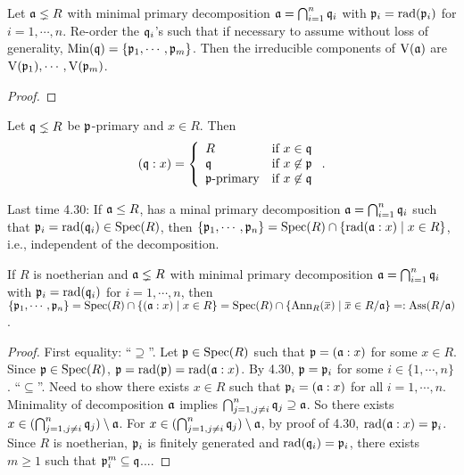 \begin{proposition}
    Let $\mathfrak{a} \lneq R$ with minimal primary decomposition $\mathfrak{a} = \bigcap_{i=1}^{n} \mathfrak{q}_i$ with $\mathfrak{p}_i = \operatorname{rad}(\mathfrak{p}_i)$ for $i = 1,\cdots,n$. Re-order the $\mathfrak{q}_i$'s such that if necessary to assume without loss of generality, $\operatorname{Min}(\mathfrak{q}) = \{\mathfrak{p}_1,\cdots,\mathfrak{p}_m\}$. Then the irreducible components of $\operatorname{V}(\mathfrak{a})$ are $\operatorname{V}(\mathfrak{p}_1),\cdots,\operatorname{V}(\mathfrak{p}_m)$.
\end{proposition}

\begin{proof}
\end{proof}

\begin{proposition}
    Let $\mathfrak{q} \lneq R$ be $\mathfrak{p}$-primary and $x \in R$. Then 
    \[
        (\mathfrak{q}:x) = \left\{
            \begin{array}{ll}
                R &\text{if }x \in \mathfrak{q} \\
                \mathfrak{q} &\text{if }x \not \in \mathfrak{p} \\
                \mathfrak{p}\text{-primary} &\text{if }x \not \in \mathfrak{q} \\
            \end{array}
        \right..
    \]
\end{proposition}

Last time 4.30: If $\mathfrak{a} \leq R$, has a minal primary decomposition $\mathfrak{a} = \bigcap_{i=1}^{n}\mathfrak{q}_i$ such that $\mathfrak{p}_i = \operatorname{rad}(\mathfrak{q}_i) \in \operatorname{Spec}(R)$, then $\{\mathfrak{p}_1,\cdots,\mathfrak{p}_n\} = \operatorname{Spec}(R) \cap \{\operatorname{rad}(\mathfrak{a}:x) \mid x \in R\}$, i.e., independent of the decomposition. 

\begin{theorem}
    If $R$ is noetherian and $\mathfrak{a} \lneq R$ with minimal primary decomposition $\mathfrak{a} = \bigcap_{i=1}^{n} \mathfrak{q}_i$ with $\mathfrak{p}_i = \operatorname{rad}(\mathfrak{q}_i)$ for $i = 1,\cdots,n$, then $\{\ffp_1,\cdots,\ffp_n\} = \operatorname{Spec}(R) \cap \{(\ffa:x) \mid x \in R\} = \operatorname{Spec}(R) \cap \{\operatorname{Ann}_R(\overbar{x}) \mid \overbar{x} \in R/\ffa\} =: \operatorname{Ass}(R/\ffa)$.
\end{theorem}

\begin{proof}
    First equality: ``$\supseteq$''. Let $\mathfrak{p} \in \operatorname{Spec}(R)$ such that $\mathfrak{p} = (\mathfrak{a}:x)$ for some $x \in R$. Since $\mathfrak{p} \in \operatorname{Spec}(R)$, $\mathfrak{p} = \operatorname{rad}(\mathfrak{p}) = \operatorname{rad}(\mathfrak{a}:x)$. By 4.30, $\mathfrak{p} = \mathfrak{p}_i$ for some $i \in \{1,\cdots,n\}$. ``$\subseteq$''. Need to show there exists $x \in R$ such that $\mathfrak{p}_i = (\mathfrak{a}:x)$ for all $i=1,\cdots,n$. Minimality of decomposition $\mathfrak{a}$ implies $\bigcap_{j=1, j \neq i}^{n} \mathfrak{q}_j \supseteq \mathfrak{a}$. So there exists $x \in (\bigcap_{j=1,j \neq i}^{n} \mathfrak{q}_j) \setminus \mathfrak{a}$. For $x \in (\bigcap_{j=1,j \neq i}^{n}\mathfrak{q}_j) \setminus \mathfrak{a}$, by proof of 4.30, $\operatorname{rad}(\mathfrak{a}:x) = \mathfrak{p}_i$. Since $R$ is noetherian, $\mathfrak{p}_i$ is finitely generated and $\operatorname{rad}(\mathfrak{q}_i) = \mathfrak{p}_i$, there exists $m \geq 1$ such that $\mathfrak{p}_i^{m} \subseteq \mathfrak{q}$....  \par  
\end{proof}

